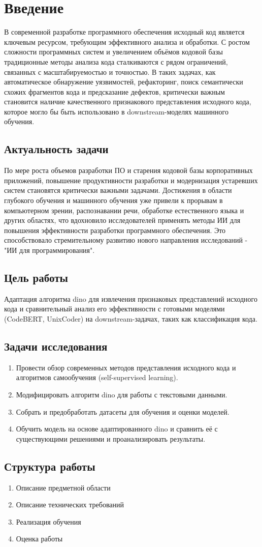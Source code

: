 \documentclass[../document.tex]{subfiles}
\begin{document}
    \section*{Введение}
    \par В современной разработке программного обеспечения исходный код является ключевым ресурсом, требующим эффективного анализа и обработки. С ростом сложности программных систем и увеличением объёмов кодовой базы традиционные методы анализа кода сталкиваются с рядом ограничений, связанных с масштабируемостью и точностью. В таких задачах, как автоматическое обнаружение уязвимостей, рефакторинг, поиск семантически схожих фрагментов кода и предсказание дефектов, критически важным становится наличие качественного признакового представления исходного кода, которое могло бы быть использовано в downstream-моделях машинного обучения.
    \subsection*{Актуальность задачи}
    \par По мере роста объемов разработки ПО и старения кодовой базы корпоративных приложений, повышение продуктивности разработки и модернизация устаревших систем становятся критически важными задачами. Достижения в области глубокого обучения и машинного обучения уже привели к прорывам в компьютерном зрении, распознавании речи, обработке естественного языка и других областях, что вдохновило исследователей применять методы ИИ для повышения эффективности разработки программного обеспечения. Это способствовало стремительному развитию нового направления исследований - "ИИ для программирования". 
    \subsection*{Цель работы}
    \par Адаптация алгоритма \gls{dino} для извлечения признаковых представлений исходного кода и сравнительный анализ его эффективности с готовыми моделями (CodeBERT, UnixCoder) на downstream-задачах, таких как классификация кода.
    \subsection*{Задачи исследования}
    \begin{enumerate}
        \item Провести обзор современных методов представления исходного кода и алгоритмов самообучения (self-supervised learning).
        \item Модифицировать алгоритм \gls{dino} для работы с текстовыми данными.
        \item Собрать и предобработать датасеты для обучения и оценки моделей.
        \item Обучить модель на основе адаптированного \gls{dino} и сравнить её с существующими решениями и проанализировать результаты.
    \end{enumerate}
    \subsection*{Структура работы}
    \begin{enumerate}
        \item Описание предметной области
        \item Описание технических требований
        \item Реализация обучения
        \item Оценка работы 
    \end{enumerate}
\end{document}
